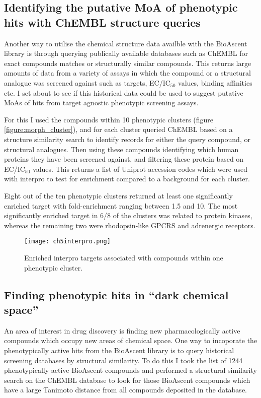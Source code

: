 \documentclass[a4paper,11pt,twoside,openright]{scrbook}
\begin{document}
\subsection{Identifying the putative MoA of phenotypic hits with ChEMBL structure queries}

Another way to utilise the chemical structure data availble with the BioAscent library is through querying publically available databases such as ChEMBL for exact compounds matches or structurally similar compounds.
This returns large amounts of data from a variety of assays in which the compound or a structural analogue was screened against such as targets, EC/IC$_{50}$ values, binding affinities etc.
I set about to see if this historical data could be used to suggest putative MoAs of hits from target agnostic phenotypic screening assays.

For this I used the compounds within 10 phenotypic clusters (figure \ref{figure:morph_cluster}), and for each cluster queried ChEMBL based on a structure similarity search to identify records for either the query compound, or structural analogues.
Then using these compounds identifying which human proteins they have been screened against, and filtering these protein based on EC/IC$_{50}$ values.
This returns a list of Uniprot accession codes which were used with interpro \cite{Finn2017} to test for enrichment compared to a background for each cluster.

Eight out of the ten phenotypic clusters returned at least one significantly enriched target with fold-enrichment ranging between 1.5 and 10.
The most significantly enriched target in 6/8 of the clusters was related to protein kinases, whereas the remaining two were rhodopsin-like GPCRS and adrenergic receptors.

\begin{figure}
    \captionsetup{width=0.8\textwidth}
    \caption[Interpro target enrichment]{
        Enriched interpro targets associated with compounds within one phenotypic cluster.
}
    \texttt{[image: ch5interpro.png]}
    \label{figure:interpro}
\end{figure}



\subsection{Finding phenotypic hits in ``dark chemical space''}

An area of interest in drug discovery is finding new pharmacologically active compounds which occupy new areas of chemical space. \cite{Wassermann2015}
One way to incoporate the phenotypically active hits from the BioAscent library is to query historical screening databases by structural similarity.
To do this I took the list of 1244 phenotypically active BioAscent compounds and performed a structural similarity search on the ChEMBL database to look for those BioAscent compounds which have a large Tanimoto distance from all compounds deposited in the database.
\end{document}
